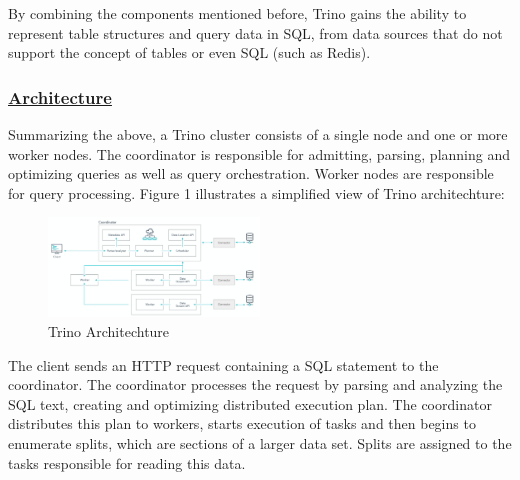 \documentclass[conference]{IEEEtran}
\begin{document}
By combining the components mentioned before, Trino gains the ability to represent table structures and query data in SQL, from data sources that do not support the concept of tables or even SQL (such as Redis).

\subsubsection{\textbf{\underline{Architecture}}}

Summarizing the above, a Trino cluster consists of a single node and one or more worker nodes. The coordinator is responsible for admitting, parsing, planning and
optimizing queries as well as query orchestration. Worker nodes are responsible for query processing. Figure 1 illustrates a simplified view of Trino architechture:
\begin{figure}[h]
	\includegraphics[width=0.5\textwidth]{images/trino-architecture.png}
	\caption{Trino Architechture}
	\label{fig:trino_architechture}
\end{figure}


The client sends an HTTP request containing a SQL statement to the coordinator. The coordinator processes the request by parsing and analyzing the SQL text,
creating and optimizing distributed execution plan. The coordinator distributes this plan to workers, starts execution of tasks and then begins to enumerate splits,
which are sections of a larger data set. Splits are assigned to the tasks responsible for reading this data.




\end{document}

